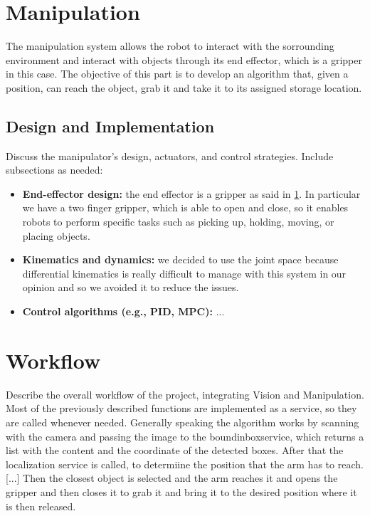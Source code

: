 \documentclass[12pt,a4paper]{article}
\begin{document}
\section{Manipulation}\label{sec:manipulation}
The manipulation system allows the robot to interact with the sorrounding environment and interact with objects through its end effector, which is a gripper in this case.
The objective of this part is to develop an algorithm that, given a position, can reach the object, grab it and take it to its assigned storage location.

\subsection{Design and Implementation}\label{susec:design}
Discuss the manipulator's design, actuators, and control strategies. Include subsections as needed:
\begin{itemize}
    \item \textbf{End-effector design:} the end effector is a gripper as said in \ref{sec:manipulation}. In particular we have a two finger gripper, which is able to open and close, so it enables robots to perform specific tasks such as picking up, holding, moving, or placing objects. 
    \item \textbf{Kinematics and dynamics:} we decided to use the joint space because differential kinematics is really difficult to manage with this system in our opinion and so we avoided it to reduce the issues.
    \item \textbf{Control algorithms (e.g., PID, MPC):} ...
\end{itemize}



\section{Workflow}\label{sec:workflow}
Describe the overall workflow of the project, integrating Vision and Manipulation. Most of the previously described functions are implemented as a service, so they are called whenever needed. Generally speaking the algorithm works by scanning with the camera and passing the image to the boundinboxservice, which returns a list with the content and the coordinate of the detected boxes. After that the localization service is called, to determiine the position that the arm has to reach. [...] Then the closest object is selected and the arm reaches it and opens the gripper and then closes it to grab it and bring it to the desired position where it is then released.
\end{document}
